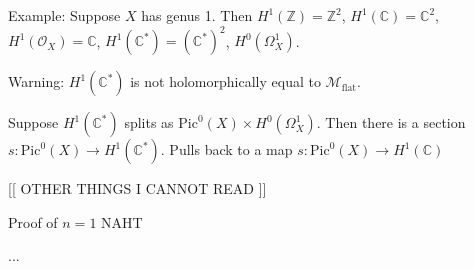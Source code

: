 Example: 
Suppose $X$ has genus 1. 
Then 
$H^1(\mathbb{Z} ) = \mathbb{Z} ^2 $, $ H^1 ( \mathbb{C} ) = \mathbb{C} ^2 $, $H^1 ( \mathcal{O} _X )  = \mathbb{C} $, 
$H^1(\mathbb{C} ^*) = (\mathbb{C} ^*) ^2 $, $H^0 (\Omega_X ^1) $. 

Warning: 
$H^1 ( \mathbb{C} ^* ) $ is not holomorphically equal to $\mathcal{M} _{\mathrm{flat}} $.

Suppose $H^1 ( \mathbb{C} ^* )$ splits as $ \mathrm{Pic} ^0 (X) \times H^0 (\Omega_X ^1 ) $. 
Then there is a section $s: \mathrm{Pic}^0 (X) \rightarrow  H^1 ( \mathbb{C} ^*) $. 
Pulls back to a map $ s: \mathrm{Pic}^0 (X) \rightarrow H^1 (\mathbb{C} ) $

[[ OTHER THINGS I CANNOT READ ]] 




Proof of $n=1 $ NAHT 

...













 

